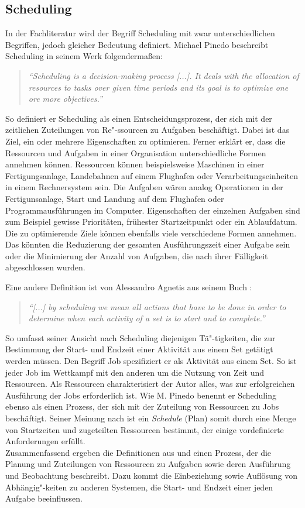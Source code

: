\subsection{Scheduling}\label{s:scheduling}
In der Fachliteratur wird der Begriff Scheduling mit zwar unterschiedlichen Begriffen, jedoch gleicher Bedeutung definiert. Michael Pinedo beschreibt Scheduling in seinem Werk \cite{mpinedo} folgendermaßen:
\begin{quote}
\textit{"`Scheduling is a decision-making process [...]. It deals with the allocation of resources to tasks over given time periods and its goal is to optimize one ore more objectives."'}
\end{quote}
So definiert er Scheduling als einen Entscheidungsprozess, der sich mit der zeitlichen Zuteilungen von Re"-ssourcen zu Aufgaben beschäftigt. Dabei ist das Ziel, ein oder mehrere Eigenschaften zu optimieren. Ferner erklärt er, dass die Ressourcen und Aufgaben in einer Organisation unterschiedliche Formen annehmen können. Ressourcen können beispielsweise Maschinen in einer Fertigungsanlage, Landebahnen auf einem Flughafen oder Verarbeitungseinheiten in einem Rechnersystem sein. Die Aufgaben wären analog Operationen in der Fertigunsanlage, Start und Landung auf dem Flughafen oder Programmausführungen im Computer. Eigenschaften der einzelnen Aufgaben sind zum Beispiel gewisse Prioritäten, frühester Startzeitpunkt oder ein Ablaufdatum. Die zu optimierende Ziele können ebenfalls viele verschiedene Formen annehmen. Das könnten die Reduzierung der gesamten Ausführungszeit einer Aufgabe sein oder die Minimierung der Anzahl von Aufgaben, die nach ihrer Fälligkeit abgeschlossen wurden.

Eine andere Definition ist von Alessandro Agnetis aus seinem Buch \cite{aagnetis}:
\begin{quote}
\textit{"`[...] by scheduling we mean all actions that have to be done in order to determine when each activity of a set is to start and to complete."'}
\end{quote}
So umfasst seiner Ansicht nach Scheduling diejenigen Tä"-tigkeiten, die zur Bestimmung der Start- und Endzeit einer Aktivität aus einem Set getätigt werden müssen. Den Begriff Job spezifiziert er als Aktivität aus einem Set. So ist jeder Job im Wettkampf mit den anderen um die Nutzung von Zeit und Ressourcen. Als Ressourcen charakterisiert der Autor alles, was zur erfolgreichen Ausführung der Jobs erforderlich ist. Wie M. Pinedo benennt er Scheduling ebenso als einen Prozess, der sich mit der Zuteilung von Ressourcen zu Jobs beschäftigt. Seiner Meinung nach ist ein \textit{Schedule} (Plan) somit durch eine Menge von Startzeiten und zugeteilten Ressourcen bestimmt, der einige vordefinierte Anforderungen erfüllt.\\
Zusammenfassend ergeben die Definitionen aus \cite{mpinedo} und \cite{aagnetis} einen Prozess, der die Planung und Zuteilungen von Ressourcen zu Aufgaben sowie deren Ausführung und Beobachtung beschreibt. Dazu kommt die Einbeziehung sowie Auflösung von Abhängig"-keiten zu anderen Systemen, die Start- und Endzeit einer jeden Aufgabe beeinflussen.

